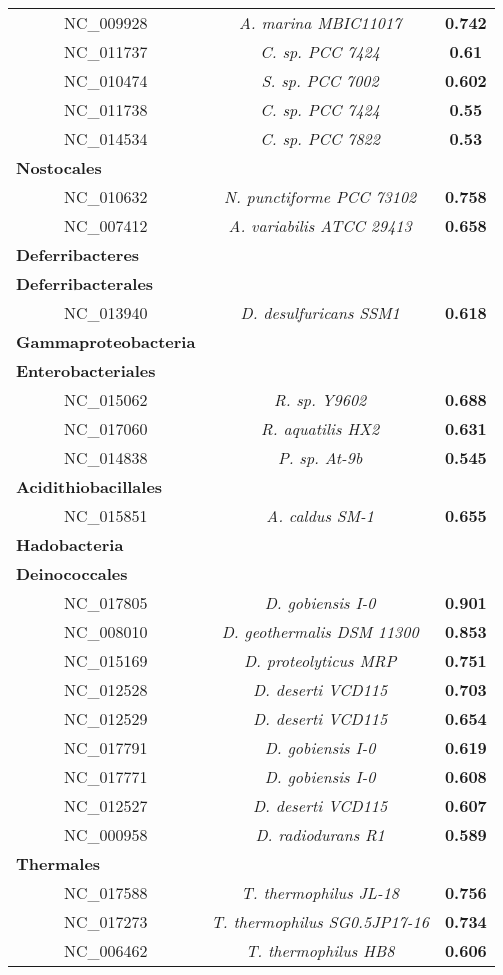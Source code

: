 \begin{landscape}
\begin{table}
\begin{minipage}[t]{0.5\textwidth}
\begin{tiny}
\begin{tabular}{c>{\itshape}c>{\bfseries}c}
NC\_009928&A. marina MBIC11017&0.742\\
NC\_011737&C. sp. PCC 7424&0.61\\
NC\_010474&S. sp. PCC 7002&0.602\\
NC\_011738&C. sp. PCC 7424&0.55\\
NC\_014534&C. sp. PCC 7822&0.53\\
\multicolumn{1}{l}{\textbf{Nostocales}}\\
NC\_010632&N. punctiforme PCC 73102&0.758\\
NC\_007412&A. variabilis ATCC 29413&0.658\\
\multicolumn{1}{l}{\textbf{Deferribacteres}}\\
\hline
\multicolumn{1}{l}{\textbf{Deferribacterales}}\\
NC\_013940&D. desulfuricans SSM1&0.618\\
\multicolumn{1}{l}{\textbf{Gammaproteobacteria}}\\
\hline
\multicolumn{1}{l}{\textbf{Enterobacteriales}}\\
NC\_015062&R. sp. Y9602&0.688\\
NC\_017060&R. aquatilis HX2&0.631\\
NC\_014838&P. sp. At-9b&0.545\\
\multicolumn{1}{l}{\textbf{Acidithiobacillales}}\\
NC\_015851&A. caldus SM-1&0.655\\
\multicolumn{1}{l}{\textbf{Hadobacteria}}\\
\hline
\multicolumn{1}{l}{\textbf{Deinococcales}}\\
NC\_017805&D. gobiensis I-0&0.901\\
NC\_008010&D. geothermalis DSM 11300&0.853\\
NC\_015169&D. proteolyticus MRP&0.751\\
NC\_012528&D. deserti VCD115&0.703\\
NC\_012529&D. deserti VCD115&0.654\\
NC\_017791&D. gobiensis I-0&0.619\\
NC\_017771&D. gobiensis I-0&0.608\\
NC\_012527&D. deserti VCD115&0.607\\
NC\_000958&D. radiodurans R1&0.589\\
\multicolumn{1}{l}{\textbf{Thermales}}\\
NC\_017588&T. thermophilus JL-18&0.756\\
NC\_017273&T. thermophilus SG0.5JP17-16&0.734\\
NC\_006462&T. thermophilus HB8&0.606\\

\end{tabular}
\end{tiny}
\end{minipage}
\end{table}
\end{landscape}
